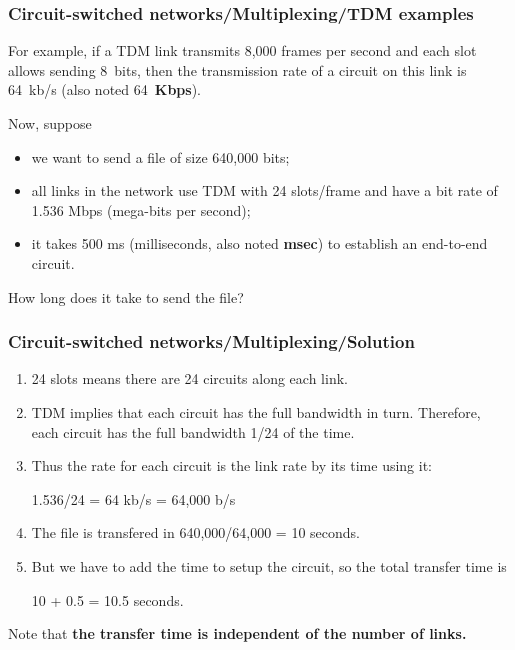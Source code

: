 %
\begin{frame}
\frametitle{Circuit-switched networks/Multiplexing/TDM examples}

For example, if a TDM link transmits 8,000 frames per second and each
slot allows sending 8~bits, then the transmission rate of a circuit on
this link is 64~kb/s (also noted 64~\textbf{Kbps}).

\bigskip

Now, suppose

\begin{itemize}

  \item we want to send a file of size 640,000 bits;

  \item all links in the network use TDM with 24 slots/frame and have
  a bit rate of 1.536 Mbps (mega-bits per second);

  \item it takes 500 ms (milliseconds, also noted \textbf{msec}) to
  establish an end-to-end circuit.

\end{itemize}

How long does it take to send the file?

\end{frame}

%
\begin{frame}
\frametitle{Circuit-switched networks/Multiplexing/Solution}

\begin{enumerate}

  \item 24 slots means there are 24 circuits along each link.

  \item TDM implies that each circuit has the full bandwidth in
  turn. Therefore, each circuit has the full bandwidth 1/24 of the
  time.

  \item Thus the rate for each circuit is the link rate by its time
  using it: 
  
  1.536/24 = 64 kb/s = 64,000 b/s

  \item The file is transfered in 640,000/64,000 = 10 seconds.

  \item But we have to add the time to setup the circuit, so the total
  transfer time is 

  10 + 0.5 = 10.5 seconds.

\end{enumerate}

Note that \textbf{the transfer time is independent of the number of
links.}

\end{frame}

